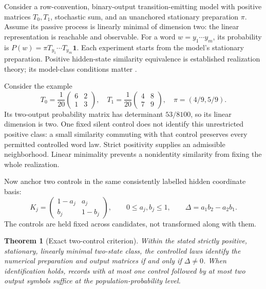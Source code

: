 \documentclass[11pt,letterpaper]{article}
\newtheorem{theorem}{Theorem}[section]
\newcommand{\one}{\mathbf1}
\begin{document}
Consider a row-convention, binary-output transition-emitting model with positive matrices $T_0,T_1$, stochastic sum, and an unanchored stationary preparation $\pi$. Assume its passive process is linearly minimal of dimension two:
the linear representation is reachable and observable. For a word
\(w=y_1\cdots y_m\), its probability is
\(P(w)=\pi T_{y_1}\cdots T_{y_m}\one\). Each experiment starts from the
model's stationary preparation. Positive hidden-state similarity equivalence is established realization theory; its model-class conditions matter \cite{vanluyten}.

Consider the example \cite{internalintervention}
\[
 T_0=\frac1{20}\begin{pmatrix}6&2\\1&3\end{pmatrix},\quad
 T_1=\frac1{20}\begin{pmatrix}4&8\\7&9\end{pmatrix},\quad
 \pi=(4/9,5/9).
\]
Its two-output probability matrix has determinant $53/8100$, so its linear dimension is two. One fixed silent control does not identify this unrestricted positive class: a small similarity commuting with that control preserves every permitted controlled word law. Strict positivity supplies an admissible neighborhood. Linear minimality prevents a nonidentity similarity from fixing the whole realization.

Now anchor two controls in the same consistently labelled hidden coordinate basis:
\[
 K_j=\begin{pmatrix}1-a_j&a_j\\b_j&1-b_j\end{pmatrix},
 \qquad 0\le a_j,b_j\le1,\qquad \Delta=a_1b_2-a_2b_1.
\]
The controls are held fixed across candidates, not transformed along with them.

\begin{theorem}[Exact two-control criterion]
Within the stated strictly positive, stationary, linearly minimal two-state class, the controlled laws identify the numerical preparation and output matrices if and only if $\Delta\ne0$. When identification holds, records with at most one control followed by at most two output symbols suffice at the population-probability level.
\end{theorem}
\end{document}
